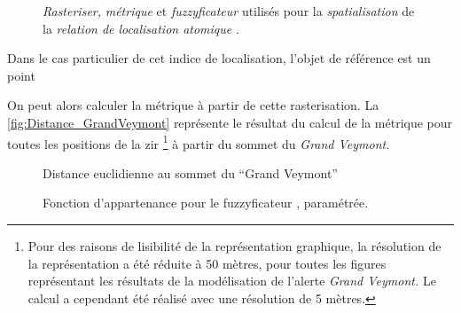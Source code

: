 \begin{figure}
  \centering
  
  \caption{\emph{Rasteriser,} \emph{métrique} et \emph{fuzzyficateur}
    utilisés pour la \emph{spatialisation} de la \emph{relation de
      localisation atomique}
    \protect{}.}
  \label{fig:ex_parties_statialisation_horsdeplani}
\end{figure}

Dans le cas particulier de cet indice de localisation, l'objet de
référence est un point


On peut alors calculer la métrique à partir de cette rasterisation. La
\autoref{fig:Distance_GrandVeymont} représente le résultat du calcul
de la métrique  pour toutes les positions de la
\ac{zir} \footnote{Pour des raisons de lisibilité de la représentation
  graphique, la résolution de la représentation a été réduite à 50
  mètres, pour toutes les figures représentant les résultats de la
  modélisation de l'alerte \emph{Grand Veymont.} Le calcul a cependant
  été réalisé avec une résolution de 5 mètres.} à partir du sommet du
\emph{Grand Veymont.}

\begin{figure}
  \centering
  
  \caption{Distance euclidienne au sommet du \enquote{Grand Veymont}}
  \label{fig:Distance_GrandVeymont}
\end{figure}


\begin{figure}
  \centering
  
  \caption{Fonction d'appartenance pour le fuzzyficateur
    \protect{}, paramétrée.}
  \label{fig:fuzzy_veyont_distanceSommet}
\end{figure}


